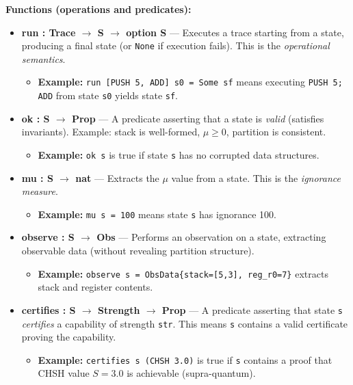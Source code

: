 \textbf{Functions (operations and predicates):}
\begin{itemize}
    \item \textbf{run : Trace $\to$ S $\to$ option S} — Executes a trace starting from a state, producing a final state (or \texttt{None} if execution fails). This is the \textit{operational semantics}.
    \begin{itemize}
        \item \textbf{Example:} \texttt{run [PUSH 5, ADD] s0 = Some sf} means executing \texttt{PUSH 5; ADD} from state \texttt{s0} yields state \texttt{sf}.
    \end{itemize}
    
    \item \textbf{ok : S $\to$ Prop} — A predicate asserting that a state is \textit{valid} (satisfies invariants). Example: stack is well-formed, $\mu \geq 0$, partition is consistent.
    \begin{itemize}
        \item \textbf{Example:} \texttt{ok s} is true if state \texttt{s} has no corrupted data structures.
    \end{itemize}
    
    \item \textbf{mu : S $\to$ nat} — Extracts the $\mu$ value from a state. This is the \textit{ignorance measure}.
    \begin{itemize}
        \item \textbf{Example:} \texttt{mu s = 100} means state \texttt{s} has ignorance 100.
    \end{itemize}
    
    \item \textbf{observe : S $\to$ Obs} — Performs an observation on a state, extracting observable data (without revealing partition structure).
    \begin{itemize}
        \item \textbf{Example:} \texttt{observe s = ObsData\{stack=[5,3], reg\_r0=7\}} extracts stack and register contents.
    \end{itemize}
    
    \item \textbf{certifies : S $\to$ Strength $\to$ Prop} — A predicate asserting that state \texttt{s} \textit{certifies} a capability of strength \texttt{str}. This means \texttt{s} contains a valid certificate proving the capability.
    \begin{itemize}
        \item \textbf{Example:} \texttt{certifies s (CHSH 3.0)} is true if \texttt{s} contains a proof that CHSH value $S = 3.0$ is achievable (supra-quantum).
    \end{itemize}
    

\end{itemize}
